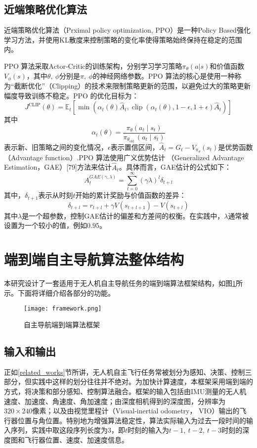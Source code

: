 \subsection{近端策略优化算法}
\label{PPO_alg}
近端策略优化算法\cite{schulman2017proximal}（Prximal policy optimization, PPO）是一种Policy Based强化学习方法，并使用KL散度来控制策略的变化率使得策略始终保持在稳定的范围内。

PPO 算法采取Actor-Critic的训练架构，分别学习学习策略$\pi_\theta(a|s)$和价值函数$V_\phi(s)$，其中$\theta,\ \phi$分别是$\pi,\ \phi$的神经网络参数。PPO 算法的核心是使用一种称为“截断优化”（Clipping）的技术来限制策略更新的范围，以避免过大的策略更新幅度导致训练不稳定。PPO 的优化目标为：
\[
  J^{\mathrm{CLIP}}(\theta)=\mathbb{E}_{t}\left[\min \left(\alpha_{t}(\theta) \hat{A}_{t}, \operatorname{clip}\left(\alpha_{t}(\theta), 1-\epsilon, 1+\epsilon\right) \hat{A}_{t}\right)\right]
\]
其中
\[
  \alpha_{t}(\theta)=\frac{\pi_{\theta}\left(a_{t} \mid s_{t}\right)}{\pi_{\theta_{\text {old }}}\left(a_{t} \mid s_{t}\right)}
\]
表示新、旧策略之间的变化情况，$\epsilon$表示置信区间，$\hat{A}_t = G_t-V_{\pi_\theta}(s_t)$是优势函数（Advantage function）.PPO 算法使用广义优势估计
（Generalized Advantage Estimation，GAE）[79]方法来估计$\hat{A}_t$。具体而言，GAE估计的公式如下：
\[
  A_{t}^{G A E(\gamma, \lambda)}=\sum_{l=0}^{\infty}(\gamma \lambda)^{l} \delta_{t+l}
\]
其中，$\delta_{t+1}$表示从时刻$t$开始的累计奖励与价值函数的差异：
\[
  \delta_{t+l}=r_{t+l}+\gamma V\left(s_{t+l+1}\right)-V\left(s_{t+l}\right)
\]
其中$\lambda$是一个超参数，控制GAE估计的偏差和方差间的权衡。在实践中，$\lambda$通常被设置为一个较小的值，例如$0.95$。

\section{端到端自主导航算法整体结构}
本研究设计了一套适用于无人机自主导航任务的端到端算法框架结构，如图\ref{fig_framework}所示。下面将详细介绍各部分的功能。
\begin{figure}
  \centering
  \texttt{[image: framework.png]}
  \caption{自主导航端到端算法框架}
  \label{fig_framework}
\end{figure}

\subsection{输入和输出}
正如\ref{related_works}节所讲，无人机自主飞行任务常被划分为感知、决策、控制三部分，但实践中这样的划分往往并不绝对。为加快计算速度，本框架采用端到端的方式，将决策和部分感知、控制算法融合。框架的输入包括由IMU测量的无人机速度、加速度、角速度、角加速度；由深度相机得到的深度图，分辨率为$320\times240$像素；以及由视觉里程计（Visual-inertial odometry， VIO）输出的飞行器位置与角位置。特别地为增强算法稳定性，算法实际输入为过去一段时间的输入序列，实践中取这段序列长度为3，即$t$时刻的输入为$t-1,\ t-2,\ t-3$时刻的深度图和飞行器位置、速度、加速度信息。

